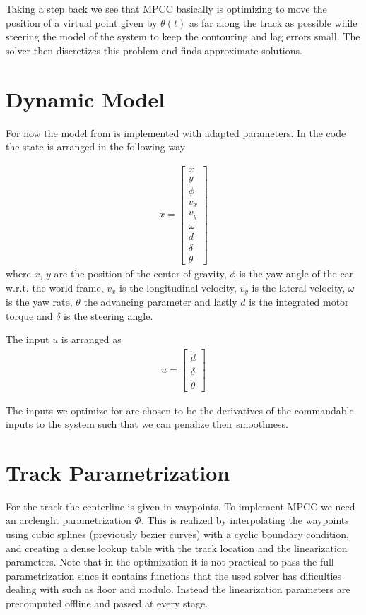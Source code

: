 \documentclass[12pt]{article}
\begin{document}
Taking a step back we see that MPCC basically is optimizing to move the position of a virtual point given by $\theta(t)$ as far along the track as possible while steering the model of the system to keep the contouring and lag errors small. The solver then discretizes this problem and finds approximate solutions.
\section{Dynamic Model}

For now the model from \cite{liniger2015optimization} is implemented with adapted parameters. In the code the state is arranged in the following way

\begin{align}
x = \begin{bmatrix}
x\\
y\\
\phi\\
v_x\\
v_y\\
\omega\\
d\\
\delta\\
\theta
\end{bmatrix}
\end{align}
where $x$, $y$ are the position of the center of gravity, $\phi$ is the yaw angle of the car w.r.t. the world frame, $v_x$ is the longitudinal velocity, $v_y$ is the lateral velocity, $\omega$ is the yaw rate, $\theta$ the advancing parameter and lastly $d$ is the integrated motor torque and $\delta$ is the steering angle.

The input $u$ is arranged as
\begin{align}
u = \begin{bmatrix}
\dot{d}\\
\dot\delta\\
\dot\theta
\end{bmatrix}
\end{align} 

The inputs we optimize for are chosen to be the derivatives of the commandable inputs to the system such that we can penalize their smoothness.

\section{Track Parametrization}

For the track the centerline is given in waypoints. To implement MPCC we need an arclenght parametrization $\Phi$. This is realized by interpolating the waypoints using cubic splines (previously bezier curves) with a cyclic boundary condition, and creating a dense lookup table with the track location and the linearization parameters. Note that in the optimization it is not practical to pass the  full parametrization since it contains functions that the used solver has dificulties dealing with such as floor and modulo. Instead the linearization parameters are precomputed offline and passed at every stage.   
\end{document}
